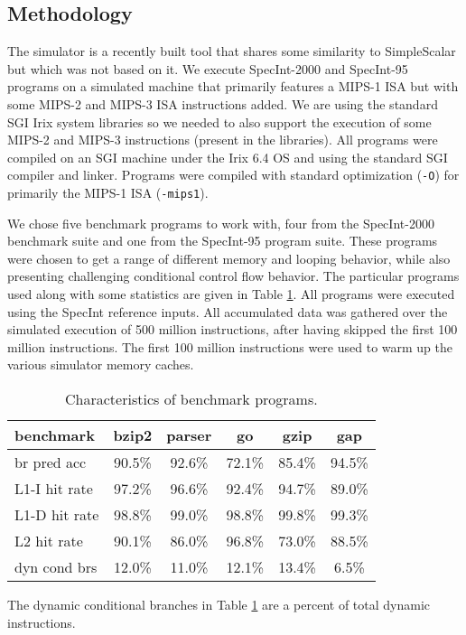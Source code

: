 \documentclass[10pt,twocolumn,dvips]{article}
\begin{document}
\subsection{Methodology}
%
The simulator is a recently built tool that shares some similarity
to SimpleScalar \cite{Austin97} but which was not based on it.
We execute
SpecInt-2000 and SpecInt-95 programs on a simulated machine
that primarily features a MIPS-1 ISA but with some MIPS-2 and
MIPS-3 ISA instructions added.  We are using the standard SGI Irix system
libraries so we needed to also support the execution of some
MIPS-2 and MIPS-3 instructions (present in the libraries).
All programs were compiled on an SGI machine under the
Irix 6.4 OS and using the standard SGI compiler and linker.  
Programs were compiled with
standard optimization ({\tt -O}) for primarily the MIPS-1 ISA ({\tt -mips1}).

We chose five benchmark programs to work with,
four from the SpecInt-2000 benchmark suite
and one from the SpecInt-95 program suite.
These programs were chosen to get a range of different memory and looping
behavior, while also presenting challenging conditional control flow
behavior.
The particular programs used along with some statistics 
are given in Table \ref{tab:benches}.
All programs were executed using the SpecInt reference inputs.
All accumulated data was gathered over the simulated execution of
500 million instructions,
after having skipped the first 100 million instructions.
The first 100 million instructions were used to warm up the
various simulator memory caches.
%
\begin{table}
\scriptsize{
\begin{center}
\caption{Characteristics of benchmark programs.}
\label{tab:benches}
\begin{tabular}{|l|c|c|c|c|c|}
\hline 
benchmark&bzip2&parser&go&gzip&gap\\
\hline 
\hline 
br pred acc&90.5\%&92.6\%&72.1\%&85.4\%&94.5\%\\
\hline 
L1-I hit rate&97.2\%&96.6\%&92.4\%&94.7\%&89.0\%\\
\hline 
L1-D hit rate&98.8\%&99.0\%&98.8\%&99.8\%&99.3\%\\
\hline 
L2 hit rate&90.1\%&86.0\%&96.8\%&73.0\%&88.5\%\\
\hline 
dyn cond brs&12.0\%&11.0\%&12.1\%&13.4\%&6.5\%\\
\hline
\end{tabular}
\end{center}
}
\end{table}
%
The dynamic conditional branches in Table \ref{tab:benches} are
a percent of total dynamic instructions.
%
%
\end{document}
